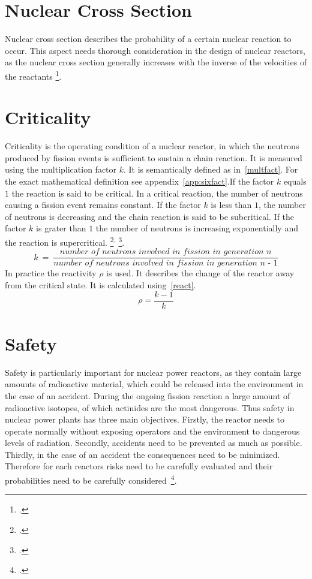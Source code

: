 \section{Nuclear Cross Section}
Nuclear cross section describes the probability of a certain nuclear reaction to occur. This
aspect needs thorough consideration in the design of nuclear reactors, as the nuclear cross section
generally increases with the inverse of the velocities of the reactants \footcite[108]{nucfundamentals}.

\section{Criticality}
Criticality is the operating condition of a nuclear reactor, in which the neutrons produced by fission
events is sufficient to sustain a chain reaction. It is measured using the multiplication factor
$k$. It is semantically defined as in~\ref{multfact}. For the exact mathematical definition see 
appendix~\ref{app:sixfact}.If the factor $k$ equals $1$ the reaction is said to be
critical. In a critical reaction, the number of neutrons causing a fission event remains constant. 
If the factor $k$ is less than $1$, the number of neutrons is decreasing and the chain reaction is said to be subcritical. If the factor
$k$ is grater than $1$ the number of neutrons is increasing exponentially and the reaction is supercritical.
\footcite[308]{nucfundamentals}\textsuperscript{,} \footcite[39]{ReactorPhysics}.
\begin{equation}
    \label{multfact}
    k~=~\frac{\textit{number of neutrons involved in fission in generation n}}{\textit{number of neutrons involved in fission in generation n - 1}}
\end{equation}
In practice the reactivity $\rho$ is used. It describes the change of the reactor away from the critical
state. It is calculated using~\ref{react}.
\begin{equation}
    \label{react}
    \rho = \frac{k-1}{k}
\end{equation}

\section{Safety}
Safety is particularly important for nuclear power reactors, as they contain large amounts of radioactive
material, which could be released into the environment in the case of an accident. During the ongoing
fission reaction a large amount of radioactive isotopes, of which actinides are the most dangerous.
Thus safety in nuclear power plants has three main objectives. Firstly, the reactor needs to operate normally
without exposing operators and the environment to dangerous levels of radiation. Secondly, accidents need
to be prevented as much as possible. Thirdly, in the case of an accident the consequences need to be minimized.
Therefore for each reactors risks need to be carefully evaluated and their probabilities need to be
carefully considered~\footcite[793]{engHandbook}.

